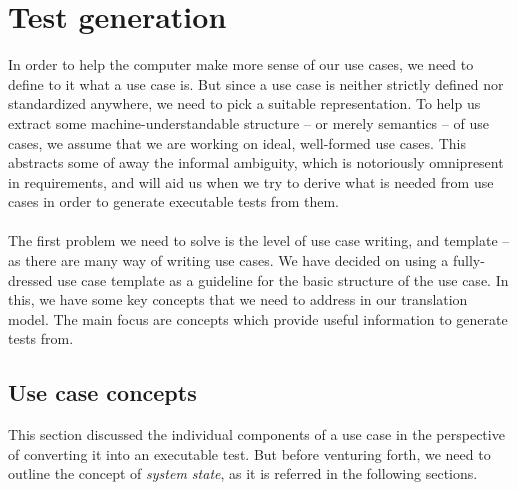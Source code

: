 \chapter{Test generation}
In order to help the computer make more sense of our use cases, we need to define to it what a use case is. But since a use case is neither strictly defined nor standardized anywhere, we need to pick a suitable representation.
To help us extract some machine-understandable structure -- or merely semantics -- of use cases, we assume that we are working on ideal, well-formed use cases. This abstracts some of away the informal ambiguity, which is notoriously omnipresent in requirements, and will aid us when we try to derive what is needed from use cases in order to generate executable tests from them.\\\\
The first problem we need to solve is the level of use case writing, and template -- as there are many way of writing use cases. 
We have decided on using a fully-dressed use case template\cite{larman2005applying} as a guideline for the basic structure of the use case. In this, we have some key concepts that we need to address in our translation model. The main focus are concepts which provide useful information to generate tests from.

\section{Use case concepts}
This section discussed the individual components of a use case in the perspective of converting it into an executable test. But before venturing forth, we need to outline the concept of \emph{system state}, as it is referred in the following sections.

